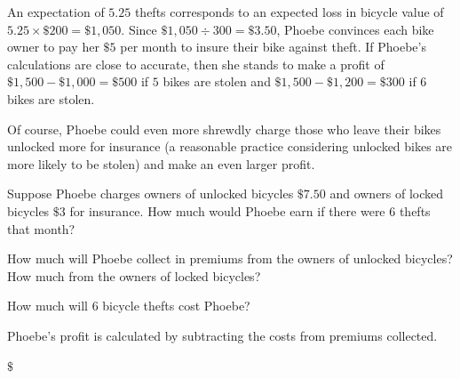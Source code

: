 \documentclass{ximera}
\begin{document}
An expectation of $5.25$ thefts corresponds to an expected loss in bicycle value of $5.25\times\$200=\$1,050$. Since $\$1,050\div 300=\$3.50$, Phoebe convinces each bike owner to pay her $\$5$ per month to insure their bike against theft. If Phoebe's calculations are close to accurate, then she stands to make a profit of $\$1,500-\$1,000=\$500$ if $5$ bikes are stolen and $\$1,500-\$1,200=\$300$ if $6$ bikes are stolen.

Of course, Phoebe could even more shrewdly charge those who leave their bikes unlocked more for insurance (a reasonable practice considering unlocked bikes are more likely to be stolen) and make an even larger profit.


\begin{question}
Suppose Phoebe charges owners of unlocked bicycles $\$7.50$ and owners of locked bicycles $\$3$ for insurance. How much would Phoebe earn if there were $6$ thefts that month?

\begin{hint}
How much will Phoebe collect in premiums from the owners of unlocked bicycles? How much from the owners of locked bicycles?
\end{hint}
\begin{hint}
How much will $6$ bicycle thefts cost Phoebe?
\end{hint}
\begin{hint}
Phoebe's profit is calculated by subtracting the costs from premiums collected.
\end{hint}
$\$$

\end{question}
\end{document}
